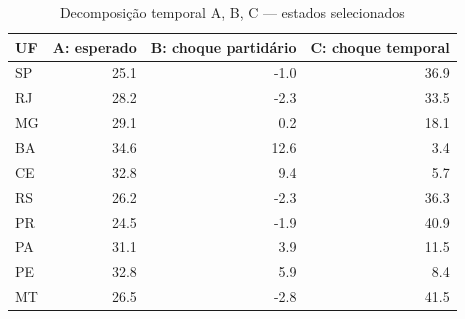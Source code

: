 \documentclass[
]{article}
\newenvironment{Shaded}{\begin{snugshade}}{\end{snugshade}}
\newcommand{\AttributeTok}[1]{\textcolor[rgb]{0.13,0.29,0.53}{#1}}
\newcommand{\CommentTok}[1]{\textcolor[rgb]{0.56,0.35,0.01}{\textit{#1}}}
\newcommand{\ConstantTok}[1]{\textcolor[rgb]{0.56,0.35,0.01}{#1}}
\newcommand{\FunctionTok}[1]{\textcolor[rgb]{0.13,0.29,0.53}{\textbf{#1}}}
\newcommand{\NormalTok}[1]{#1}
\newcommand{\OtherTok}[1]{\textcolor[rgb]{0.56,0.35,0.01}{#1}}
\newcommand{\SpecialCharTok}[1]{\textcolor[rgb]{0.81,0.36,0.00}{\textbf{#1}}}
\newcommand{\StringTok}[1]{\textcolor[rgb]{0.31,0.60,0.02}{#1}}
\begin{document}
\begin{Shaded}
\end{Shaded}

\begin{table}

\caption{\label{tab:temporal-decomposicao}Decomposição temporal A, B, C — estados selecionados}
\centering
\begin{tabular}[t]{l|r|r|r}
\hline
UF & A: esperado & B: choque partidário & C: choque temporal\\
\hline
SP & 25.1 & -1.0 & 36.9\\
\hline
RJ & 28.2 & -2.3 & 33.5\\
\hline
MG & 29.1 & 0.2 & 18.1\\
\hline
BA & 34.6 & 12.6 & 3.4\\
\hline
CE & 32.8 & 9.4 & 5.7\\
\hline
RS & 26.2 & -2.3 & 36.3\\
\hline
PR & 24.5 & -1.9 & 40.9\\
\hline
PA & 31.1 & 3.9 & 11.5\\
\hline
PE & 32.8 & 5.9 & 8.4\\
\hline
MT & 26.5 & -2.8 & 41.5\\
\hline
\end{tabular}
\end{table}
\end{document}
